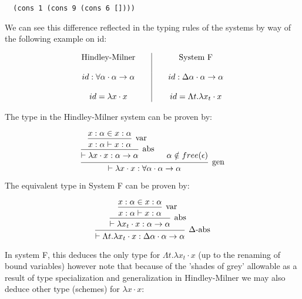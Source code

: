 \begin{verbatim}
  (cons 1 (cons 9 (cons 6 [])))  
\end{verbatim}

We can see this difference reflected in the typing rules of the
systems by way of the following example on id:

\[\begin{array}{c@{\qquad}|@{\qquad}c}
      \mbox{Hindley-Milner}
      &
      \mbox{System F}
      \\\\
      id : \forall \alpha \cdot \alpha \to \alpha
      &
      id : \Delta \alpha \cdot \alpha \to \alpha
      \\\\
      id = \lambda x \cdot x
      &
      id = \Lambda t . \lambda x_t \cdot x
\end{array} \]

The type in the Hindley-Milner system can be proven by:


\[\begin{array}{c}
\mbox{\begin{prooftree}
        \hypo{x : \alpha \in x : \alpha}   
      \infer1[var]{x : \alpha \vdash x : \alpha}
    \infer1[abs]{\vdash \lambda x \cdot x : \alpha \to \alpha}
    \hypo{\alpha \notin free(\epsilon)}
   \infer2[gen]{\vdash \lambda x \cdot x : \forall \alpha \cdot
   \alpha \to \alpha}
\end{prooftree}}
\end{array} \]


The equivalent type in System F can be proven by:

\[\begin{array}{c}
\mbox{\begin{prooftree}
      \hypo{x : \alpha \in x : \alpha}
    \infer1[var]{x : \alpha \vdash x : \alpha}
   \infer1[abs]{\vdash \lambda x_t \cdot x : \alpha \to \alpha}
   \infer1[$\Delta$-abs]{\vdash \Lambda t . \lambda x_t \cdot
     x : \Delta \alpha \cdot \alpha \to \alpha}
\end{prooftree}}
\end{array} \]

In system F, this deduces the only type for $\Lambda t . \lambda x_t
\cdot x$ (up to the renaming of bound variables) however note that
because of the 'shades of grey' allowable as a result of type
specialization and generalization in Hindley-Milner we may
also deduce other type (schemes) for $\lambda x \cdot x$:

